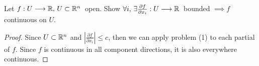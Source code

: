 \documentclass[../hw4]{subfiles}
\begin{document}
\begin{problem}[3]
Let $f:U\longrightarrow\mathbb{R},\, U\subset \mathbb{R}^{n}\,$ open. Show $\forall i,\,  \exists \frac{\partial f}{\partial x_i}:U\longrightarrow\mathbb{R}\,$ bounded $\implies f$ continuous on $U$.
\end{problem}
\begin{proof}
	Since $U\subset \mathbb{R}^{n}$ and $\left|\frac{\partial f}{\partial x_i}\right|\le c$,
	then we can apply problem (1) to each partial of $f$. Since $f$ is continuous in all component directions, it is also everywhere continuous.
\end{proof}
\end{document}
